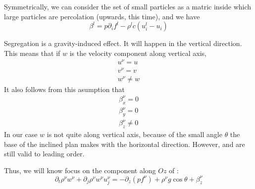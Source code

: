 \documentclass[11pt]{book}
\begin{document}
Symmetrically, we can consider the set of small particles as a matric inside which large particles are percolation (upwards, this time), and we have
\begin{equation}
\beta^l = p \partial_i f^l - \rho^l c (u^l_i - u_i)
\end{equation}

Segregation is a gravity-induced effect. It will happen in the vertical direction. This means that if $w$ is the velocity component along vertical axis,
\begin{align} \label{eq:vel_asump}
u^\nu = u \\
v^\nu = v \\
w^\nu \neq w
\end{align}
It also follows from this asumption that 
\begin{align} \label{eq:forces_asump}
\beta^\nu_x = 0 \\
\beta^\nu_y = 0 \\
\beta^\nu_z \neq 0
\end{align}
In our case $w$ is not quite along vertical axis, because of the small angle $\theta$ the base of the inclined plan makes with the horizontal direction. 
However, \cite{eq:vel_asump} and \cite{eq:forces_sump} are still valid to leading order.

Thus, we will know focus on the component along $Oz$ of \cite{eq:mom_bal}:
\begin{equation}
	\partial_t \rho^\nu w^\nu + \partial_j \rho^\nu w^\nu u_j^\nu = -\partial_z \left( p f^\nu \right) + \rho^\nu g \cos \theta + \beta^\nu_z 
\end{equation}
\end{document}
